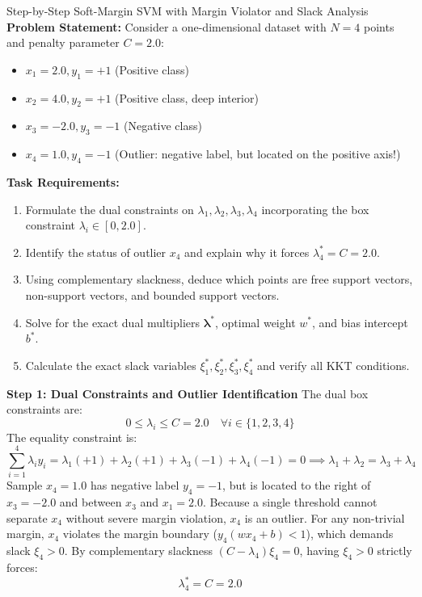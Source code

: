 \begin{examplebox}[breakable]{Step-by-Step Soft-Margin SVM with Margin Violator and Slack Analysis}
\textbf{Problem Statement:}
Consider a one-dimensional dataset with $N = 4$ points and penalty parameter $C = 2.0$:
\begin{itemize}
    \item $x_1 = 2.0, y_1 = +1$ (Positive class)
    \item $x_2 = 4.0, y_2 = +1$ (Positive class, deep interior)
    \item $x_3 = -2.0, y_3 = -1$ (Negative class)
    \item $x_4 = 1.0, y_4 = -1$ (Outlier: negative label, but located on the positive axis!)
\end{itemize}

\textbf{Task Requirements:}
\begin{enumerate}
    \item Formulate the dual constraints on $\lambda_1, \lambda_2, \lambda_3, \lambda_4$ incorporating the box constraint $\lambda_i \in [0, 2.0]$.
    \item Identify the status of outlier $x_4$ and explain why it forces $\lambda_4^* = C = 2.0$.
    \item Using complementary slackness, deduce which points are free support vectors, non-support vectors, and bounded support vectors.
    \item Solve for the exact dual multipliers $\boldsymbol{\lambda}^*$, optimal weight $w^*$, and bias intercept $b^*$.
    \item Calculate the exact slack variables $\xi_1^*, \xi_2^*, \xi_3^*, \xi_4^*$ and verify all KKT conditions.
\end{enumerate}

\tcblower

\textbf{Step 1: Dual Constraints and Outlier Identification}
The dual box constraints are:
\begin{equation}
0 \le \lambda_i \le C = 2.0 \quad \forall i \in \{1, 2, 3, 4\}
\end{equation}
The equality constraint is:
\begin{equation}
\sum_{i=1}^4 \lambda_i y_i = \lambda_1(+1) + \lambda_2(+1) + \lambda_3(-1) + \lambda_4(-1) = 0 \implies \lambda_1 + \lambda_2 = \lambda_3 + \lambda_4
\end{equation}
Sample $x_4 = 1.0$ has negative label $y_4 = -1$, but is located to the right of $x_3 = -2.0$ and between $x_3$ and $x_1 = 2.0$. Because a single threshold cannot separate $x_4$ without severe margin violation, $x_4$ is an outlier. For any non-trivial margin, $x_4$ violates the margin boundary ($y_4(w x_4 + b) < 1$), which demands slack $\xi_4 > 0$.
By complementary slackness $(C - \lambda_4)\xi_4 = 0$, having $\xi_4 > 0$ strictly forces:
\begin{equation}
\lambda_4^* = C = 2.0
\end{equation}


\end{examplebox}
